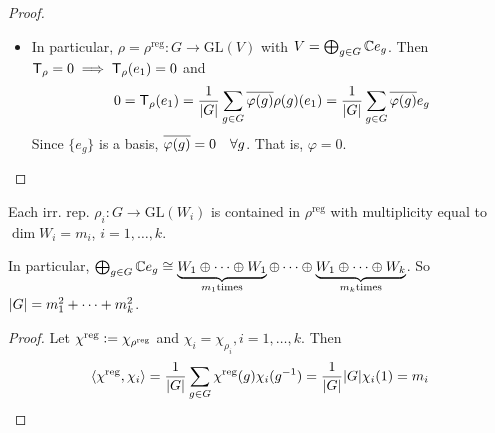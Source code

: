 \begin{theorem}
\begin{proof}
\begin{itemize}
      \item In particular, $\rho = \rho^{\text{reg}}: G\to \text{GL}(V)$ with
        $V = \bigoplus_{g\in G} \mathbb{C} e_g$. Then
        ${\sf T}_\rho = 0 \implies {\sf T}_\rho(e_1) = 0$ and
        \[
          0 = {\sf T}_\rho(e_1) = \frac{1}{\lvert G\rvert} \sum_{g\in G}
          \overline{\varphi(g)} \rho(g)(e_1) = \frac{1}{\lvert G\rvert} \sum_{g\in G}
          \overline{\varphi(g)} e_g
        \]
        Since $\{ e_g \}$ is a basis, $\overline{\varphi(g)} = 0 \quad \forall g$.
        That is, $\varphi = 0$. \qedhere
    \end{itemize}
  \end{proof}
\end{theorem}

\begin{prop}
  Each irr. rep. $\rho_i: G\to \text{GL}(W_i)$ is contained in
  $\rho^\text{reg}$ with multiplicity equal to $\dim W_i = m_i$,
  $i = 1,\dots, k$.

  In particular, $\bigoplus_{g\in G} \mathbb{C} e_g \cong
  \underbrace{W_1\oplus\dots\oplus W_1}_{m_1 \text{times}} \oplus \dots \oplus
  \underbrace{W_1\oplus\dots\oplus W_k}_{m_k \text{times}}$.
  So $\lvert G\rvert = m_1^2 + \dots + m_k^2$.

  \begin{proof}
    Let $\chi^\text{reg} \vcentcolon= \chi_{\rho^\text{reg}}$ and
    $\chi_i = \chi_{\rho_i}, i = 1, \dots, k$. Then
    \[
      \langle\chi^\text{reg}, \chi_i\rangle = \frac{1}{\lvert G\rvert} \sum_{g\in G}
      \chi^\text{reg}(g)\chi_i(g^{-1})
      = \frac{1}{\lvert G\rvert} \lvert G\rvert \chi_i(1) = m_i
    \]
  \end{proof}
\end{prop}

